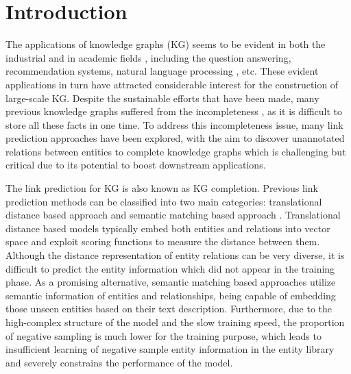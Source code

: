 \documentclass[journal]{IEEEtran}
\begin{document}
\IEEEdisplaynontitleabstractindextext



\IEEEpeerreviewmaketitle


\section{Introduction}
The applications of knowledge graphs (KG) seems to be evident in both the industrial and in academic fields \cite{kazemi2018simple}, including the question answering, recommendation systems, natural language processing \cite{sundermeyer2015feedforward}, etc. These evident applications in turn have attracted considerable interest for the construction of large-scale KG. Despite the sustainable efforts that have been made, many previous knowledge graphs suffered from the incompleteness \cite{rossi2021knowledge}, as it is difficult to store all these facts in one time. To address this incompleteness issue, many link prediction approaches have been explored, with the aim to discover unannotated relations between entities to complete knowledge graphs which is challenging but critical due to its potential to boost downstream applications. 


The link prediction for KG is also known as KG completion.
Previous link prediction methods can be classified into two main categories: translational distance based approach and semantic matching based approach \cite{wang2017knowledge}.
Translational distance based models typically embed both entities and relations into vector space and exploit scoring functions to measure the distance between them. Although the distance representation of entity relations can be very diverse, it is difficult to predict the entity information which did not appear in the training phase. As a promising alternative, semantic matching based approaches utilize semantic information of entities and relationships, being capable of embedding those unseen entities based on their text description. Furthermore, due to the high-complex structure of the model and the slow training speed, the proportion of negative sampling is much lower for the training purpose, which leads to insufficient learning of negative sample entity information in the entity library and severely constrains the performance of the model.
\end{document}

